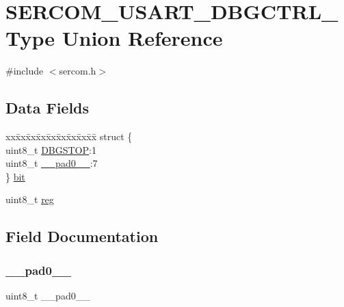 \hypertarget{union_s_e_r_c_o_m___u_s_a_r_t___d_b_g_c_t_r_l___type}{}\section{S\+E\+R\+C\+O\+M\+\_\+\+U\+S\+A\+R\+T\+\_\+\+D\+B\+G\+C\+T\+R\+L\+\_\+\+Type Union Reference}
\label{union_s_e_r_c_o_m___u_s_a_r_t___d_b_g_c_t_r_l___type}


{\ttfamily \#include $<$sercom.\+h$>$}

\subsection*{Data Fields}
\begin{DoxyCompactItemize}
\item 
\begin{tabbing}
xx\=xx\=xx\=xx\=xx\=xx\=xx\=xx\=xx\=\kill
struct \{\\
\>uint8\_t \mbox{\hyperlink{union_s_e_r_c_o_m___u_s_a_r_t___d_b_g_c_t_r_l___type_ace8eb5df93c3176eb9283ab7f4b25bfb}{DBGSTOP}}:1\\
\>uint8\_t \mbox{\hyperlink{union_s_e_r_c_o_m___u_s_a_r_t___d_b_g_c_t_r_l___type_a8b4eebe79ded0459acec2f4950102ba3}{\_\_pad0\_\_}}:7\\
\} \mbox{\hyperlink{union_s_e_r_c_o_m___u_s_a_r_t___d_b_g_c_t_r_l___type_a3a4f0aeae67280a26f40d1cf27f97ea9}{bit}}\\

\end{tabbing}\item 
uint8\+\_\+t \mbox{\hyperlink{union_s_e_r_c_o_m___u_s_a_r_t___d_b_g_c_t_r_l___type_a9428adc9af4653a2050e2536b55dec8d}{reg}}
\end{DoxyCompactItemize}


\subsection{Field Documentation}
\mbox{\label{union_s_e_r_c_o_m___u_s_a_r_t___d_b_g_c_t_r_l___type_a8b4eebe79ded0459acec2f4950102ba3}} 
\subsubsection{\texorpdfstring{\_\_pad0\_\_}{\_\_pad0\_\_}}
{\footnotesize\ttfamily uint8\+\_\+t \+\_\+\+\_\+pad0\+\_\+\+\_\+}

